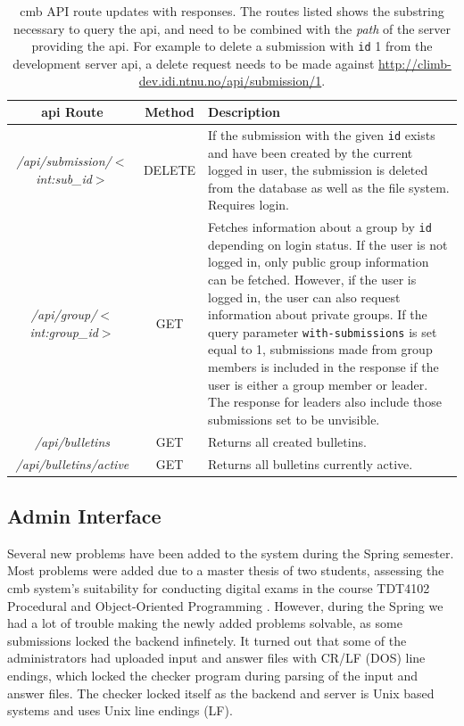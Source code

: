 \begin{table}[h!]
    \centering
    \begin{tabular}{ | c | c | p{4cm} | }
    \hline
    \textbf{\gls{api} Route} & \textbf{Method} & \textbf{Description} \\
    \hline
    \textit{/api/submission/$<$int:sub\_id$>$} & DELETE & If the submission with the given \texttt{id} exists and have been created by the current logged in user, the submission is deleted from the database as well as the file system. Requires login.\\ \hline
    \textit{/api/group/$<$int:group\_id$>$} & GET & Fetches information about a group by \texttt{id} depending on login status. If the user is not logged in, only public group information can be fetched. However, if the user is logged in, the user can also request information about private groups. If the query parameter \texttt{with-submissions} is set equal to 1, submissions made from group members is included in the response if the user is either a group member or leader. The response for leaders also include those submissions set to be unvisible. \\ \hline
    \textit{/api/bulletins} & GET & Returns all created bulletins. \\ \hline
    \textit{/api/bulletins/active} & GET & Returns all bulletins currently active. \\ \hline
    \end{tabular}
    \caption[\gls{cmb} API route updates with responses]{\gls{cmb} API route updates with responses. The routes listed shows the substring necessary to query the \gls{api}, and need to be combined with the \textit{path} of the server providing the \gls{api}. For example to delete a submission with \texttt{id} 1 from the development server \gls{api}, a delete request needs to be made against \url{http://climb-dev.idi.ntnu.no/api/submission/1}.}
    \label{tab:cmb-updated-routes}
\end{table}
\clearpage
\subsection{Admin Interface}
Several new problems have been added to the system during the Spring semester. Most problems were added due to a master thesis of two students, assessing the \gls{cmb} system's suitability for conducting digital exams in the course TDT4102 Procedural and Object-Oriented Programming \cite{TDT4102}. However, during the Spring we had a lot of trouble making the newly added problems solvable, as some submissions locked the backend infinetely. It turned out that some of the administrators had uploaded input and answer files with CR/LF (DOS) line endings, which locked the checker program during parsing of the input and answer files. The checker locked itself as the backend and server is Unix based systems and uses Unix line endings (LF). \\

